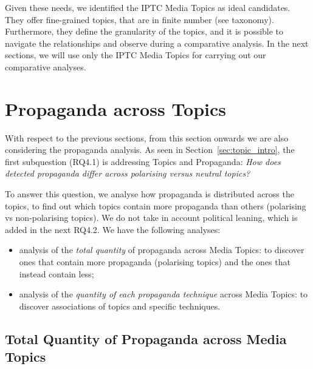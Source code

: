 Given these needs, we identified the IPTC Media Topics as ideal candidates.
They offer fine-grained topics, that are in finite number (see taxonomy). Furthermore, they define the granularity of the topics, and it is possible to navigate the relationships and observe during a comparative analysis.
In the next sections, we will use only the IPTC Media Topics for carrying out our comparative analyses.


\section{\statusgreen Propaganda across Topics}
\label{sec:topic_propaganda}

With respect to the previous sections, from this section onwards we are also considering the propaganda analysis.
As seen in Section~\ref{sec:topic_intro}, the first subquestion (RQ4.1) is addressing Topics and Propaganda:
\emph{How does detected propaganda differ across polarising versus neutral topics?}

To answer this question, we analyse how propaganda is distributed across the topics, to find out which topics contain more propaganda than others (polarising vs non-polarising topics).
We do not take in account political leaning, which is added in the next RQ4.2.
We have the following analyses:

\begin{itemize}
    \item analysis of the \emph{total quantity} of propaganda across Media Topics: to discover ones that contain more propaganda (polarising topics) and the ones that instead contain less;
    \item analysis of the \emph{quantity of each propaganda technique} across Media Topics: to discover associations of topics and specific techniques.
\end{itemize}

\subsection{\statusgreen Total Quantity of Propaganda across Media Topics}
\label{ssec:topic_propaganda_tot}

